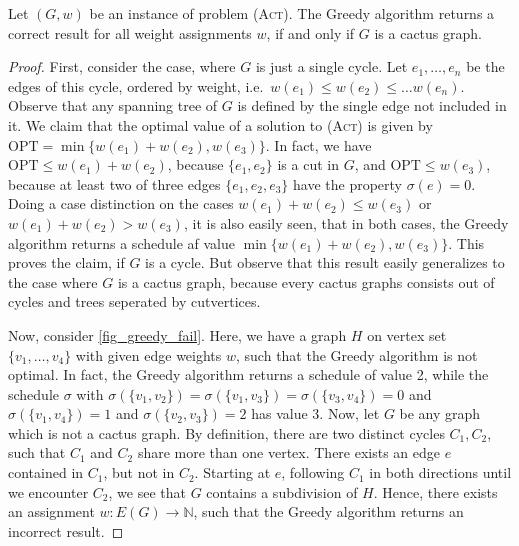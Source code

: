 \documentclass[runningheads]{llncs}
\numberwithin{equation}{section}
\newcommand{\N}{\mathbb{N}}
\newcommand{\set}[1]{\{ #1 \}}
\newcommand{\fromto}[2]{\set{#1, \ldots, #2}}
\newcommand{\act}{\textsc{(Act)}}
\begin{document}
\begin{theorem}
Let $(G, w)$ be an instance of problem {\act}. The Greedy algorithm returns a correct result for all weight assignments $w$, if and only if $G$ is a cactus graph.
\end{theorem}
\begin{proof}
First, consider the case, where $G$ is just a single cycle. Let $e_1, \dots, e_n$ be the edges of this cycle, ordered by weight, i.e.\ $w(e_1) \leq w(e_2) \leq \dots w(e_n)$. Observe that any spanning tree of $G$ is defined by the single edge not included in it. We claim that the optimal value of a solution to {\act} is given by  $\text{OPT} = \min\set{w(e_1) + w(e_2), w(e_3)}$. In fact, we have $\text{OPT} \leq w(e_1) + w(e_2)$, because $\set{e_1, e_2}$ is a cut in $G$, and $\text{OPT} \leq w(e_3)$, because at least two of three edges $\set{e_1, e_2, e_3}$ have the property $\sigma(e) = 0$. Doing a case distinction on the cases $w(e_1) + w(e_2) \leq w(e_3)$ or $w(e_1) + w(e_2) > w(e_3)$, it is also easily seen, that in both cases, the Greedy algorithm returns a schedule af value $\min\set{w(e_1) + w(e_2), w(e_3)}$. This proves the claim, if $G$ is a cycle. But observe that this result easily generalizes to the case where $G$ is a cactus graph, because every cactus graphs consists out of cycles and trees seperated by cutvertices.

Now, consider \cref{fig_greedy_fail}. Here, we have a graph $H$ on vertex set $\fromto{v_1}{v_4}$ with given edge weights $w$, such that the Greedy algorithm is not optimal. In fact, the Greedy algorithm returns a schedule of value 2, while the schedule $\sigma$ with $\sigma(\set{v_1,v_2}) = \sigma(\set{v_1,v_3}) = \sigma(\set{v_3,v_4}) = 0$ and $\sigma(\set{v_1,v_4}) = 1$ and $\sigma(\set{v_2,v_3}) = 2$ has value 3. Now, let $G$ be any graph which is not a cactus graph. By definition, there are two distinct cycles $C_1, C_2$, such that $C_1$ and $C_2$ share more than one vertex. There exists an edge $e$ contained in $C_1$, but not in $C_2$. Starting at $e$, following $C_1$ in both directions until we encounter $C_2$, we see that $G$ contains a subdivision of $H$. Hence, there exists an assignment $w : E(G) \rightarrow \N$, such that the Greedy algorithm returns an incorrect result.
\end{proof}
\end{document}
